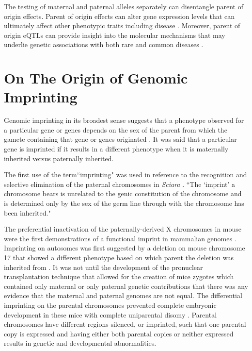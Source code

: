 The testing of maternal and paternal alleles separately can disentangle parent of origin effects. Parent of origin effects can alter gene expression levels that can ultimately affect other phenotypic traits including disease \cite{Lawson2013,Peters2014} . Moreover, parent of origin eQTLs can provide insight into the molecular mechanisms that may underlie genetic associations with both rare and common diseases \cite{Lawson2013,Peters2014,Kong:2009kk,Stridh2014,Falls1999}.



\section{On The Origin of Genomic Imprinting }

Genomic imprinting in its broadest sense suggests that a phenotype observed for a particular gene or genes depends on the sex of the parent from which the gamete containing that gene or genes originated \cite{Sapienza:1989vm}. It was said that a particular gene is imprinted if it results in a different phenotype when it is maternally inherited versus paternally inherited.

The first use of the term``imprinting" was used in reference to the recognition and selective elimination of the paternal chromosomes in \textit{Sciara} \cite{Crouse:1960vc,Sapienza:1989vm}. ``The `imprint' a chromosome bears is unrelated to the genic constitution of the chromosome and is determined only by the sex of the germ line through with the chromosome has been inherited." \cite{Crouse:1960vc} 

The preferential inactivation of the paternally-derived X chromosomes in mouse were the first demonstrations of a functional imprint in mammalian genomes \cite{Takagi:1975ua,Lyon:1984gh,Chandra:1975tb}. Imprinting on autosomes was first suggested by a deletion on mouse chromosome 17 that showed a different phenotype based on which parent the deletion was inherited from \cite{Johnson:1974uf,Johnson:1974kc}. It was not until the development of the pronuclear transplantation technique that allowed for the creation of mice zygotes which contained only maternal or only paternal genetic contributions that there was any evidence that the maternal and paternal genomes are not equal. The differential imprinting on the parental chromosomes prevented complete embryonic development in these mice with complete uniparental disomy \cite{Sapienza:1989vm,McGrath:1984ky}. Parental chromosomes have different regions silenced, or imprinted, such that one parental copy is expressed and having either both parental copies or neither expressed results in genetic and developmental abnormalities.

